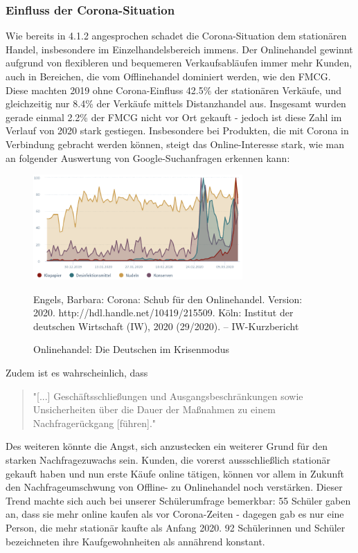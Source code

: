 \begin{folding} \subsubsection{Einfluss der Corona-Situation}
 
 Wie bereits in 4.1.2 angesprochen schadet die Corona-Situation dem stationären Handel, insbesondere im Einzelhandelsbereich immens. Der Onlinehandel gewinnt aufgrund von flexibleren und bequemeren Verkaufsabläufen immer mehr Kunden, auch in Bereichen, die vom Offlinehandel dominiert werden, wie den \ac{FMCG}. 
Diese machten 2019 ohne Corona-Einfluss 42.5\% der stationären Verkäufe, und gleichzeitig nur 8.4\% der Verkäufe mittels Distanzhandel aus. Insgesamt wurden gerade einmal 2.2\% der \ac{FMCG} nicht vor Ort gekauft - jedoch ist diese Zahl im Verlauf von 2020 stark gestiegen\cite{corona-schub}. Insbesondere bei Produkten, die mit Corona in Verbindung gebracht werden können, steigt das Online-Interesse stark, wie man an folgender Auswertung von Google-Suchanfragen erkennen kann: 

 \begin{figure}[h]
    \begin{center}
        \includegraphics[width=8cm]{media/Fabian-Corona-Produkte.png}
        \caption{Onlinehandel: Die Deutschen im Krisenmodus}
        \label{corona-produkte}
        \bildquelle  Engels, Barbara:   Corona: Schub für den Onlinehandel. Version: 2020. http://hdl.handle.net/10419/215509. Köln: Institut der deutschen Wirtschaft (IW), 2020 (29/2020). – IW-Kurzbericht
    \end{center}
\end{figure}
\noindent Zudem ist es wahrscheinlich, dass

\begin{quote}
    "[...] Geschäftsschließungen und Ausgangsbeschränkungen   sowie Unsicherheiten über die Dauer der Maßnahmen zu einem  Nachfragerückgang [führen]."\cite{corona-wettbewerb}
\end{quote}
Des weiteren könnte die Angst, sich anzustecken ein weiterer Grund für den starken Nachfragezuwachs sein. Kunden, die vorerst aussschließlich stationär gekauft haben und nun erste Käufe online tätigen, können vor allem in Zukunft den Nachfrageumschwung von Offline- zu Onlinehandel noch verstärken\cite{corona-schub}. Dieser Trend machte sich auch bei unserer Schülerumfrage bemerkbar: 55 Schüler gaben an, dass sie mehr online kaufen als vor Corona-Zeiten - dagegen gab es nur eine Person, die mehr stationär kaufte als Anfang 2020. 92 Schülerinnen und Schüler bezeichneten ihre Kaufgewohnheiten als annährend konstant.


\end{folding}
